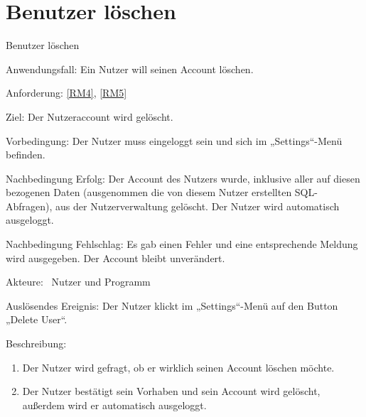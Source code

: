\section{Benutzer l\"oschen}
\begin{function}{80}{Benutzer löschen}
\item[Anwendungsfall:] Ein Nutzer will seinen Account löschen.
\item[Anforderung:] \ref{RM4}, \ref{RM5}
\item[Ziel:] Der Nutzeraccount wird gelöscht.
\item[Vorbedingung:] Der Nutzer muss eingeloggt sein und sich im „Settings“-Menü befinden.
\item[Nachbedingung Erfolg:]  Der Account des Nutzers wurde, inklusive aller auf diesen bezogenen Daten (ausgenommen die von diesem Nutzer erstellten SQL-Abfragen), aus der Nutzerverwaltung gelöscht. Der Nutzer wird automatisch ausgeloggt.
\item[Nachbedingung Fehlschlag:] Es gab einen Fehler und eine entsprechende Meldung wird ausgegeben. Der Account bleibt unverändert.
\item[Akteure:] ~Nutzer und Programm
\item[Auslösendes Ereignis:] Der Nutzer klickt im „Settings“-Menü auf den Button „Delete User“.
\item[Beschreibung:] ~
\begin{enumerate}
  \item  Der Nutzer wird gefragt, ob er wirklich seinen Account löschen möchte.
  \item  Der Nutzer bestätigt sein Vorhaben und  sein Account wird gelöscht, außerdem wird er automatisch ausgeloggt.
\end{enumerate}
\end{function}

